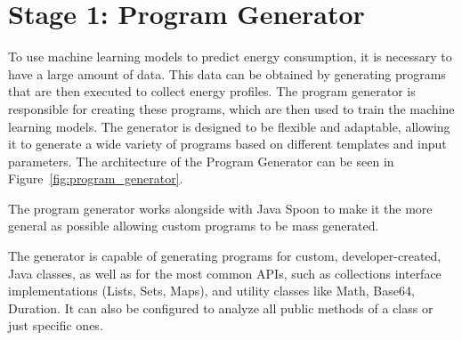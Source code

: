 \section{Stage 1: Program Generator} \label{sec:work_stage1_program_generator}




To use machine learning models to predict energy consumption, it is necessary to have a large amount of data. This data can be obtained by generating programs that are then executed to collect energy profiles. The program generator is responsible for creating these programs, which are then used to train the machine learning models. The generator is designed to be flexible and adaptable, allowing it to generate a wide variety of programs based on different templates and input parameters. The architecture of the Program Generator can be seen in Figure~\ref{fig:program_generator}.


The program generator works alongside with Java Spoon to make it the more general as possible allowing custom programs to be mass generated.

The generator is capable of generating programs for custom, developer-created, Java classes, as well as for the most common APIs, such as collections interface implementations (Lists, Sets, Maps), and utility classes like Math, Base64, Duration. It can also be configured to analyze all public methods of a class or just specific ones.

